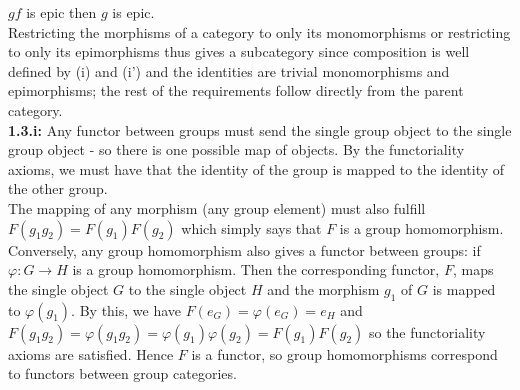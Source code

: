 \documentclass[a4paper]{article}
\begin{document}
    $gf$ is epic then $g$ is epic.\\
    \linebreak
    Restricting the morphisms of a category to only its monomorphisms or
    restricting to only its epimorphisms thus gives a subcategory since
    composition is well defined by (i) and (i') and the identities are trivial
    monomorphisms and epimorphisms; the rest of the requirements follow
    directly from the parent category.\\
    \linebreak
    \textbf{1.3.i:} Any functor between groups must send the single group
    object to the single group object - so there is one possible map of
    objects. By the functoriality axioms, we must have that the identity
    of the group is mapped to the identity of the other group.\\
    The mapping of any morphism (any group element) must also fulfill 
    $F (g_1 g_2) = F(g_1) F(g_2)$ which simply says that $F$ is a group
    homomorphism.\\
    \linebreak
    Conversely, any group homomorphism also gives a functor between groups:
    if $\varphi  \colon G \to H$ is a group homomorphism. Then the
    corresponding
    functor, $F$, maps the single object $G$ to the single object $H$ and
    the morphism $g_1$ of $G$ is mapped to $\varphi (g_1)$. By this, we
    have $F(e_G) = \varphi(e_G) = e_H$ and
    $F(g_1 g_2) = \varphi (g_1 g_2) = \varphi (g_1) \varphi(g_2) = F(g_1)
    F(g_2)$
    so the functoriality
    axioms are satisfied. Hence $F$ is a functor, so group homomorphisms
    correspond to functors between group categories.
    
    
\end{document}
